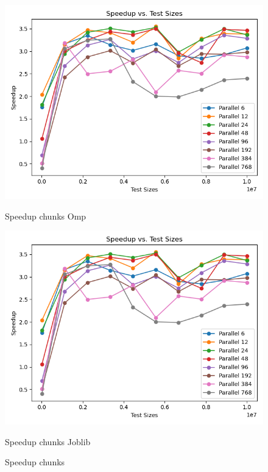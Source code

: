\documentclass[11pt]{article}
\begin{document}
    \begin{figure}[H]
        \centering
        \includegraphics[width=\linewidth]{plot_chunks_speedup}
            \caption{Speedup chunks Omp}\label{fig:chunks_speedup_omp}
        \endminipage\hfill
        \includegraphics[width=\linewidth]{plot_chunks_speedup}
            \caption{Speedup chunks Joblib}\label{fig:chunks_speedup_joblib}
        \endminipage\hfill
        \caption{Speedup chunks}
    \end{figure}
\end{document}
